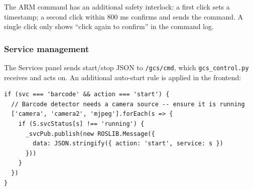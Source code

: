 \documentclass[11pt,a4paper]{article}
\begin{document}
\begin{center}
\end{center}

The ARM command has an additional safety interlock: a first click sets a
timestamp; a second click within 800 ms confirms and sends the command.
A single click only shows ``click again to confirm'' in the command log.

\subsubsection{Service management}

The Services panel sends start/stop JSON to \texttt{/gcs/cmd}, which
\texttt{gcs\_control.py} receives and acts on. An additional auto-start
rule is applied in the frontend:

\begin{lstlisting}[style=javascript, caption=Auto-start cameras when barcode service starts]
if (svc === 'barcode' && action === 'start') {
  // Barcode detector needs a camera source -- ensure it is running
  ['camera', 'camera2', 'mjpeg'].forEach(s => {
    if (S.svcStatus[s] !== 'running') {
      _svcPub.publish(new ROSLIB.Message({
        data: JSON.stringify({ action: 'start', service: s })
      }))
    }
  })
}
\end{lstlisting}

\end{document}
